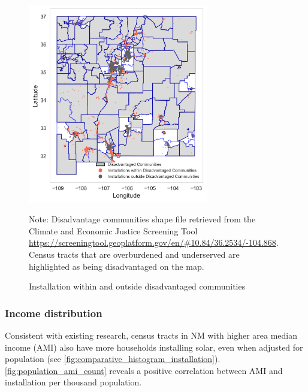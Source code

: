 \documentclass[11pt,twoside,letterpaper]{article}
\begin{document}
\begin{figure}[H]
    \centering
\includegraphics[width=0.7\textwidth]{figures/disadvantage_installation.png}
    \caption{Installation within and outside disadvantaged communities}
    \label{fig:disadvantage_installation}
        \begin{flushleft}
        \footnotesize Note: Disadvantage communities shape file retrieved from the Climate and Economic Justice Screening Tool \url{https://screeningtool.geoplatform.gov/en/#10.84/36.2534/-104.868}. Census tracts that are overburdened and underserved are highlighted as being disadvantaged on the map.
    \end{flushleft}
\end{figure}


\subsubsection{Income distribution}

Consistent with existing research, census tracts in NM with higher area median income (AMI) also have more households installing solar, even when adjusted for population (see \autoref{fig:comparative_histogram_installation}). \autoref{fig:population_ami_count} reveals a positive correlation between AMI and installation per thousand population.
\end{document}

